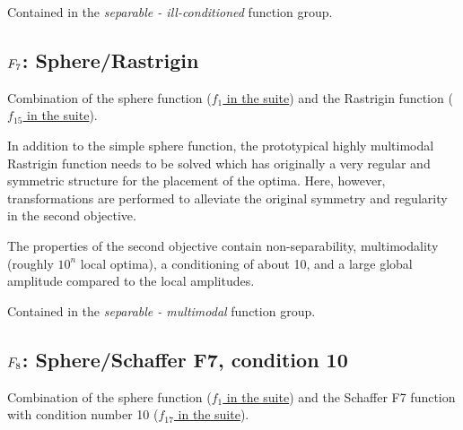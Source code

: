 Contained in the \emph{separable - ill-conditioned} function group.



\subsection[\texorpdfstring{\protect\(F_7\protect\): Sphere/Rastrigin}{F7: Sphere/Rastrigin}]{\texorpdfstring{\protect\(F_7\protect\): Sphere/Rastrigin}{}}
\label{index:sphere-rastrigin}\label{index:f7}
Combination of the sphere function (\href{https://coco.gforge.inria.fr/downloads/download16.00/bbobdocfunctions.pdf\#page=5}{\(f_1\) in the \bbob suite})
and the Rastrigin function (\href{https://coco.gforge.inria.fr/downloads/download16.00/bbobdocfunctions.pdf\#page=75}{\(f_{15}\) in the \bbob suite}).

In addition to the simple sphere function, the prototypical highly
multimodal Rastrigin function needs to be solved which has originally
a very regular and symmetric structure for the placement of the optima.
Here, however, transformations are performed to alleviate
the original symmetry and regularity in the second objective.

The properties of the second objective contain non-separability,
multimodality (roughly \(10^n\) local optima), a conditioning of
about 10, and a large global amplitude compared to the local amplitudes.

Contained in the \emph{separable - multimodal} function group.



\subsection[\texorpdfstring{\protect\(F_8\protect\): Sphere/Schaffer F7, condition 10}{F8: Sphere/Schaffer F7, condition 10}]{\texorpdfstring{\protect\(F_8\protect\): Sphere/Schaffer F7, condition 10}{}}
\label{index:f8}\label{index:sphere-schaffer-f7-condition-10}
Combination of the sphere function (\href{https://coco.gforge.inria.fr/downloads/download16.00/bbobdocfunctions.pdf\#page=5}{\(f_1\) in the \bbob suite})
and the Schaffer F7 function with condition number 10 (\href{https://coco.gforge.inria.fr/downloads/download16.00/bbobdocfunctions.pdf\#page=85}{\(f_{17}\) in the \bbob suite}).

